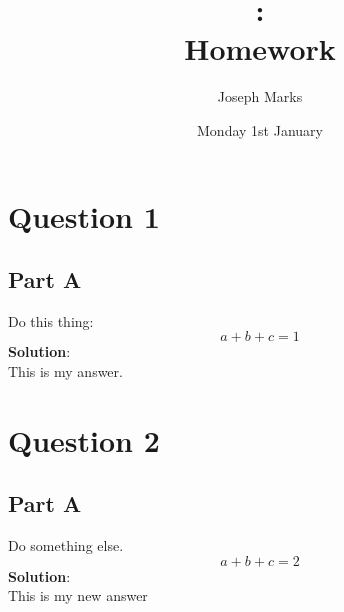 \documentclass{article}
\date{Monday 1st January}
\author{Joseph Marks}
\title{\modulecode: \modulename \\ \large Homework \hwknumber}
\newcounter{qcount}
\newcommand{\sol}{\textbf{Solution}:}
\newcommand{\question}[1]{\newpage\section*{Question #1}\setcounter{qcount}{#1}}
\renewcommand{\part}[1]{\subsection*{Part #1}}
\begin{document}
\maketitle 
\thispagestyle{empty}



\question{1}
\part{A}
Do this thing:
\begin{equation*}
a + b + c = 1
\end{equation*}
\sol\\[5px]
This is my answer.

\question{2}
\part{A}
Do something else.
\begin{equation*}
a + b + c = 2
\end{equation*}
\sol\\[5px]
This is my new answer
\end{document}

